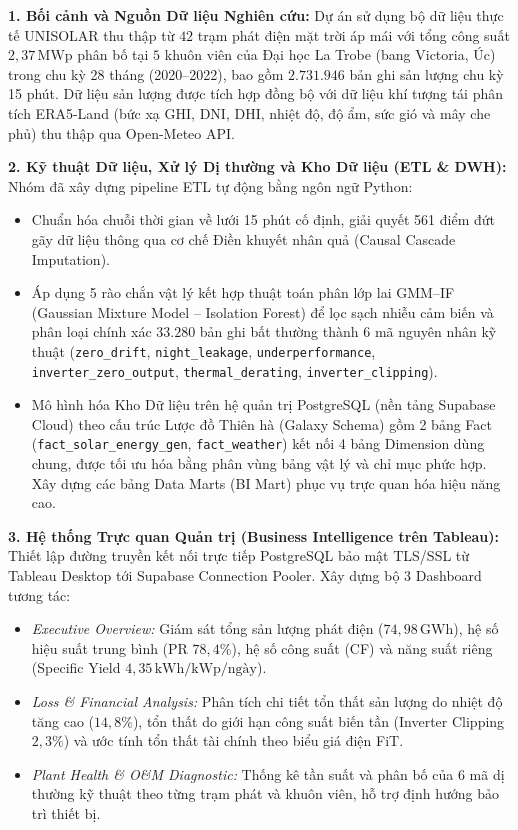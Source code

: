\documentclass[12pt, a4paper]{report}
\begin{document}
\textbf{1. Bối cảnh và Nguồn Dữ liệu Nghiên cứu:}
Dự án sử dụng bộ dữ liệu thực tế UNISOLAR thu thập từ $42$ trạm phát điện mặt trời áp mái với tổng công suất $2{,}37\,\text{MWp}$ phân bố tại $5$ khuôn viên của Đại học La Trobe (bang Victoria, Úc) trong chu kỳ 28 tháng (2020--2022), bao gồm $2.731.946$ bản ghi sản lượng chu kỳ 15 phút. Dữ liệu sản lượng được tích hợp đồng bộ với dữ liệu khí tượng tái phân tích ERA5-Land (bức xạ GHI, DNI, DHI, nhiệt độ, độ ẩm, sức gió và mây che phủ) thu thập qua Open-Meteo API.

\textbf{2. Kỹ thuật Dữ liệu, Xử lý Dị thường và Kho Dữ liệu (ETL \& DWH):}
Nhóm đã xây dựng pipeline ETL tự động bằng ngôn ngữ Python:
\begin{itemize}[noitemsep]
    \item Chuẩn hóa chuỗi thời gian về lưới 15 phút cố định, giải quyết 561 điểm đứt gãy dữ liệu thông qua cơ chế Điền khuyết nhân quả (Causal Cascade Imputation).
    \item Áp dụng 5 rào chắn vật lý kết hợp thuật toán phân lớp lai GMM--IF (Gaussian Mixture Model -- Isolation Forest) để lọc sạch nhiễu cảm biến và phân loại chính xác $33.280$ bản ghi bất thường thành 6 mã nguyên nhân kỹ thuật (\texttt{zero\_drift}, \texttt{night\_leakage}, \texttt{underperformance}, \texttt{inverter\_zero\_output}, \texttt{thermal\_derating}, \texttt{inverter\_clipping}).
    \item Mô hình hóa Kho Dữ liệu trên hệ quản trị PostgreSQL (nền tảng Supabase Cloud) theo cấu trúc Lược đồ Thiên hà (Galaxy Schema) gồm 2 bảng Fact (\texttt{fact\_solar\_energy\_gen}, \texttt{fact\_weather}) kết nối 4 bảng Dimension dùng chung, được tối ưu hóa bằng phân vùng bảng vật lý và chỉ mục phức hợp. Xây dựng các bảng Data Marts (BI Mart) phục vụ trực quan hóa hiệu năng cao.
\end{itemize}

\textbf{3. Hệ thống Trực quan Quản trị (Business Intelligence trên Tableau):}
Thiết lập đường truyền kết nối trực tiếp PostgreSQL bảo mật TLS/SSL từ Tableau Desktop tới Supabase Connection Pooler. Xây dựng bộ 3 Dashboard tương tác:
\begin{itemize}[noitemsep]
    \item \textit{Executive Overview:} Giám sát tổng sản lượng phát điện ($74{,}98\,\text{GWh}$), hệ số hiệu suất trung bình (PR $78{,}4\%$), hệ số công suất (CF) và năng suất riêng (Specific Yield $4{,}35\,\text{kWh/kWp/ngày}$).
    \item \textit{Loss \& Financial Analysis:} Phân tích chi tiết tổn thất sản lượng do nhiệt độ tăng cao ($14{,}8\%$), tổn thất do giới hạn công suất biến tần (Inverter Clipping $2{,}3\%$) và ước tính tổn thất tài chính theo biểu giá điện FiT.
    \item \textit{Plant Health \& O\&M Diagnostic:} Thống kê tần suất và phân bố của 6 mã dị thường kỹ thuật theo từng trạm phát và khuôn viên, hỗ trợ định hướng bảo trì thiết bị.
\end{itemize}
\end{document}
